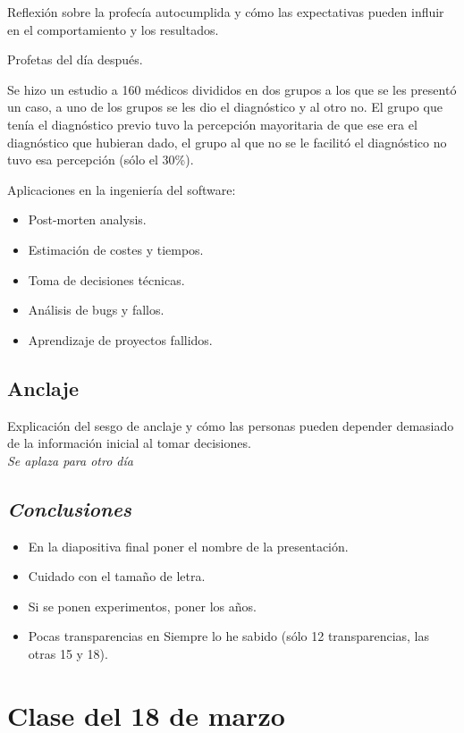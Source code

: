 \documentclass[12pt, a4paper, twoside]{article}
\begin{document}
Reflexión sobre la profecía autocumplida y cómo las expectativas pueden influir en el comportamiento y los resultados.


Profetas del día después.

Se hizo un estudio a 160 médicos divididos en dos grupos a los que se les presentó un caso, a uno de los grupos se les dio el diagnóstico
y al otro no. El grupo que tenía el diagnóstico previo tuvo la percepción mayoritaria de que ese era el diagnóstico que hubieran dado, el grupo 
al que no se le facilitó el diagnóstico no tuvo esa percepción (sólo el 30\%).
\newline

Aplicaciones en la ingeniería del software:
\begin{itemize}
    \item Post-morten analysis.
    \item Estimación de costes y tiempos.
    \item Toma de decisiones técnicas.
    \item Análisis de bugs y fallos.
    \item Aprendizaje de proyectos fallidos.
\end{itemize}


\subsection{Anclaje}
Explicación del sesgo de anclaje y cómo las personas pueden depender demasiado de la información inicial al tomar decisiones.\\
\textit{Se aplaza para otro día}


\subsection{\textit{Conclusiones}}
\begin{itemize}
    \item En la diapositiva final poner el nombre de la presentación.
    \item Cuidado con el tamaño de letra.
    \item Si se ponen experimentos, poner los años.
    \item Pocas transparencias en Siempre lo he sabido (sólo 12 transparencias, las otras 15 y 18).

\end{itemize}

\section{Clase del 18 de marzo}
\end{document}
